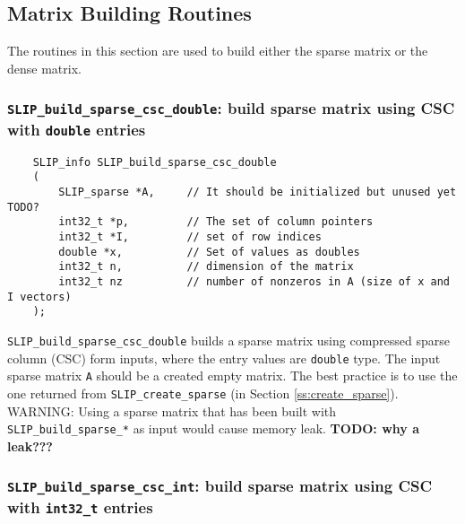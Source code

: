 \documentclass[12pt]{article}
\theoremstyle{definition}
\begin{document}
\subsection{Matrix Building Routines} \label{s:Matrix_building_routines}

The routines in this section are used to build either the sparse matrix or the
dense matrix.

\cprotect\subsubsection{\verb|SLIP_build_sparse_csc_double|: build sparse matrix using CSC with \verb|double| entries}
\label{s:user:build_sparse_csc_double}


\begin{mdframed}[userdefinedwidth=6in]
{\footnotesize
\begin{verbatim}
    SLIP_info SLIP_build_sparse_csc_double
    (
        SLIP_sparse *A,     // It should be initialized but unused yet TODO?
        int32_t *p,         // The set of column pointers
        int32_t *I,         // set of row indices
        double *x,          // Set of values as doubles
        int32_t n,          // dimension of the matrix
        int32_t nz          // number of nonzeros in A (size of x and I vectors)
    );
\end{verbatim}
} \end{mdframed}

\verb|SLIP_build_sparse_csc_double| builds a sparse matrix using compressed
sparse column (CSC) form inputs, where the entry values are \verb|double| type.
The input sparse matrix \verb|A| should be a created empty matrix. The
best practice is to use the one returned from \verb|SLIP_create_sparse| (in
Section \ref{ss:create_sparse}). WARNING: Using a sparse matrix that has been
built with \verb|SLIP_build_sparse_*| as input would cause memory leak.
{\bf TODO: why a leak???} %

\cprotect\subsubsection{\verb|SLIP_build_sparse_csc_int|: build sparse matrix using CSC with \verb|int32_t| entries}
\label{s:user:build_sparse_csc_int}
\end{document}

